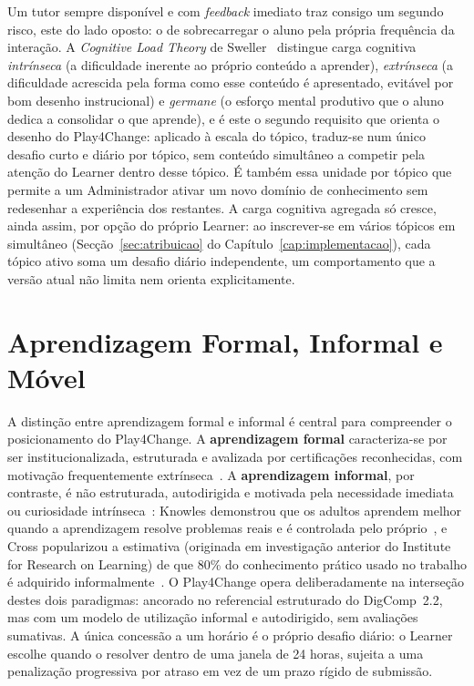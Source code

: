 Um tutor sempre disponível e com \textit{feedback} imediato traz consigo um segundo risco, este do lado oposto: o de sobrecarregar o aluno pela própria frequência da interação. A \textit{Cognitive Load Theory} de Sweller~\cite{sweller1994} distingue carga cognitiva \textit{intrínseca} (a dificuldade inerente ao próprio conteúdo a aprender), \textit{extrínseca} (a dificuldade acrescida pela forma como esse conteúdo é apresentado, evitável por bom desenho instrucional) e \textit{germane} (o esforço mental produtivo que o aluno dedica a consolidar o que aprende), e é este o segundo requisito que orienta o desenho do Play4Change: aplicado à escala do tópico, traduz-se num único desafio curto e diário por tópico, sem conteúdo simultâneo a competir pela atenção do Learner dentro desse tópico. É também essa unidade por tópico que permite a um Administrador ativar um novo domínio de conhecimento sem redesenhar a experiência dos restantes. A carga cognitiva agregada só cresce, ainda assim, por opção do próprio Learner: ao inscrever-se em vários tópicos em simultâneo (Secção~\ref{sec:atribuicao} do Capítulo~\ref{cap:implementacao}), cada tópico ativo soma um desafio diário independente, um comportamento que a versão atual não limita nem orienta explicitamente.

\section{Aprendizagem Formal, Informal e Móvel} \label{sec:formal-informal}

A distinção entre aprendizagem formal e informal é central para compreender o posicionamento do Play4Change. A \textbf{aprendizagem formal} caracteriza-se por ser institucionalizada, estruturada e avalizada por certificações reconhecidas, com motivação frequentemente extrínseca~\cite{colley2003}. A \textbf{aprendizagem informal}, por contraste, é não estruturada, autodirigida e motivada pela necessidade imediata ou curiosidade intrínseca~\cite{cross2007}: Knowles demonstrou que os adultos aprendem melhor quando a aprendizagem resolve problemas reais e é controlada pelo próprio~\cite{knowles1984}, e Cross popularizou a estimativa (originada em investigação anterior do Institute for Research on Learning) de que 80\% do conhecimento prático usado no trabalho é adquirido informalmente~\cite{cross2007}. O Play4Change opera deliberadamente na interseção destes dois paradigmas: ancorado no referencial estruturado do DigComp~2.2, mas com um modelo de utilização informal e autodirigido, sem avaliações sumativas. A única concessão a um horário é o próprio desafio diário: o Learner escolhe quando o resolver dentro de uma janela de 24 horas, sujeita a uma penalização progressiva por atraso em vez de um prazo rígido de submissão.

